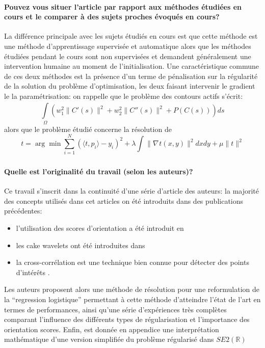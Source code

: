 \documentclass{article}
\begin{document}
\paragraph{Pouvez vous situer l'article par rapport aux méthodes étudiées en cours et le
comparer à des sujets proches évoqués en cours?} 
La différence principale avec les sujets étudiés en cours est que cette méthode est une
méthode d'apprentissage supervisée et automatique alors que les méthodes étudiées
pendant le cours sont non supervisées et demandent généralement une intervention humaine
au moment de l'initialisation.\newline
Une caractéristique commune de ces deux méthodes est la présence d'un terme de
pénalisation sur la régularité de la solution du problème d'optimisation, les deux
faisant intervenir le gradient le la paramétrisation: on rappelle que le problème des
contours actifs s'écrit:
\[
    \int\limits_{  \Omega }^{  } \left ( w_1^2 \|C'(s)\|^2 + w_2^2 \|C''(s)\|^2 +
    P(C(s)) \right )ds
\] 
alors que le problème étudié concerne la résolution de 
\[
    t = \arg \min_{  } \sum\limits_{ i=1 }^{ N } \left ( \langle t, p_i \rangle
    - y_i \right )^2 + \lambda \int\limits_{  }^{  } \| \nabla_{  } t(x, y) \|^2 dx dy + \mu \| t \|^2
    \label{eq.2} \tag{2}
\]
\paragraph{Quelle est l'originalité du travail (selon les auteurs)?}
Ce travail s'inscrit dans la continuité d'une  série d'article des auteurs: la majorité
des concepts utilisés dans cet articles on été introduits dans des publications
précédentes:
\begin{itemize}
  \item l'utilisation des scores d'orientation a été introduit en \cite{orientation-score}
  \item les cake wavelets ont été introduites dans \cite{cake}
  \item la cross-corrélation est une technique bien connue pour détecter des points
    d'intérêts \cite{cross-correlation}.
\end{itemize}
Les auteurs proposent alors une méthode de résolution pour une reformulation de la 
``regression logistique'' permettant à cette méthode d'atteindre l'état de l'art en
termes de performances, ainsi qu'une série d'expériences très complètes
comparant l'influence des différents types de régularisation et l'importance des
orientation scores. Enfin, est donnée en appendice une interprétation mathématique d'une
version simplifiée du problème régularisé dans $ SE2(\mathbb{R}) $
\end{document}
